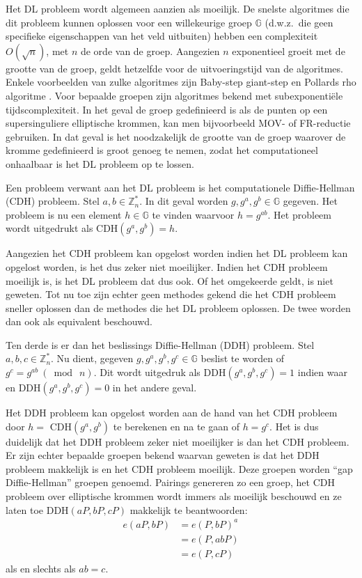 Het DL probleem wordt algemeen aanzien als moeilijk. De snelste algoritmes die dit probleem kunnen oplossen voor een willekeurige groep $\mathbb{G}$ (d.w.z.\ die geen specifieke eigenschappen van het veld uitbuiten) hebben een complexiteit $O(\sqrt{n})$, met $n$ de orde van de groep. Aangezien $n$ exponentieel groeit met de grootte van de groep, geldt hetzelfde voor de uitvoeringstijd van de algoritmes. Enkele voorbeelden van zulke algoritmes zijn Baby-step giant-step \cite{baby-step} en Pollards rho algoritme \cite{pollard-rho}. Voor bepaalde groepen zijn algoritmes bekend met subexponenti\"ele tijdscomplexiteit. In het geval de groep gedefinieerd is als de punten op een supersinguliere elliptische krommen, kan men bijvoorbeeld MOV- \cite{mov} of FR-reductie \cite{ruck} gebruiken. In dat geval is het noodzakelijk de grootte van de groep waarover de kromme gedefinieerd is groot genoeg te nemen, zodat het computationeel onhaalbaar is het DL probleem op te lossen.

Een probleem verwant aan het DL probleem is het computationele Diffie-Hellman (CDH) probleem. Stel $a, b \in \mathbb{Z}^*_n$. In dit geval worden $g, g^a, g^b \in \mathbb{G}$ gegeven. Het probleem is nu een element $h \in \mathbb{G}$ te vinden waarvoor $h = g^{ab}$. Het probleem wordt uitgedrukt als CDH$(g^a, g^b) = h$.

Aangezien het CDH probleem kan opgelost worden indien het DL probleem kan opgelost worden, is het dus zeker niet moeilijker. Indien het CDH probleem moeilijk is, is het DL probleem dat dus ook. Of het omgekeerde geldt, is niet geweten. Tot nu toe zijn echter geen methodes gekend die het CDH probleem sneller oplossen dan de methodes die het DL probleem oplossen. De twee worden dan ook als equivalent beschouwd.

Ten derde is er dan het beslissings Diffie-Hellman (DDH) probleem. Stel $a, b, c \in \mathbb{Z}^*_n$. Nu dient, gegeven $g, g^a, g^b, g^c \in \mathbb{G}$ beslist te worden of $g^c = g^{ab} \: (\bmod \: n)$. Dit wordt uitgedruk als DDH$(g^a, g^b, g^c) = 1$ indien waar en DDH$(g^a, g^b, g^c) = 0$ in het andere geval.

Het DDH probleem kan opgelost worden aan de hand van het CDH probleem door $h =$ CDH$(g^a, g^b)$ te berekenen en na te gaan of $h = g^c$. Het is dus duidelijk dat het DDH probleem zeker niet moeilijker is dan het CDH probleem. Er zijn echter bepaalde groepen bekend waarvan geweten is dat het DDH probleem makkelijk is en het CDH probleem moeilijk. Deze groepen worden ``gap Diffie-Hellman'' groepen genoemd. Pairings genereren zo een groep, het CDH probleem over elliptische krommen wordt immers als moeilijk beschouwd en ze laten toe DDH$(aP, bP, cP)$ makkelijk te beantwoorden:
\[\begin{aligned}
e(aP, bP) &= e(P, bP)^a\\
								&= e(P, abP)\\
								&= e(P, cP)
\end{aligned}\]
als en slechts als $ab = c$.

